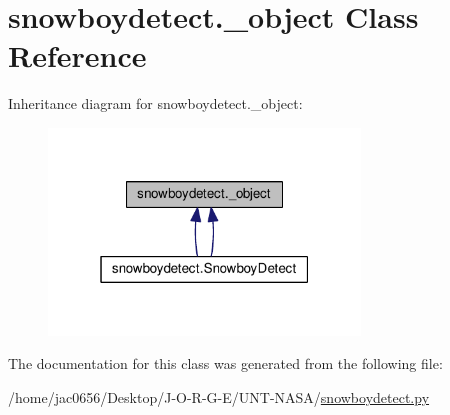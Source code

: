\hypertarget{classsnowboydetect_1_1__object}{}\section{snowboydetect.\+\_\+object Class Reference}
\label{classsnowboydetect_1_1__object}


Inheritance diagram for snowboydetect.\+\_\+object\+:
\nopagebreak
\begin{figure}[H]
\begin{center}
\leavevmode
\includegraphics[width=235pt]{classsnowboydetect_1_1__object__inherit__graph}
\end{center}
\end{figure}


The documentation for this class was generated from the following file\+:\begin{DoxyCompactItemize}
\item 
/home/jac0656/\+Desktop/\+J-\/\+O-\/\+R-\/\+G-\/\+E/\+U\+N\+T-\/\+N\+A\+S\+A/\hyperlink{snowboydetect_8py}{snowboydetect.\+py}\end{DoxyCompactItemize}
